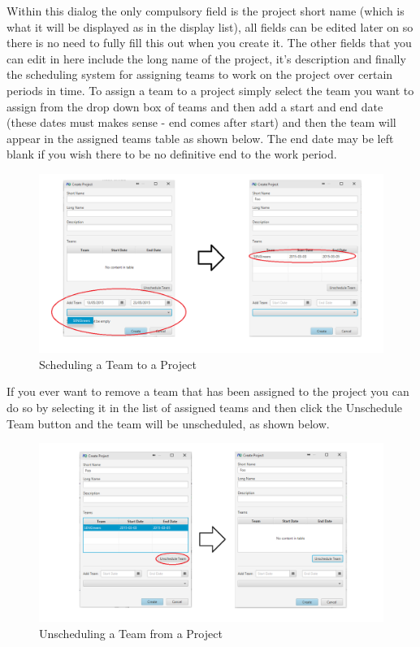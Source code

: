 Within this dialog the only compulsory field is the project short name (which is what it will be displayed as in the display list), all fields can be edited later on so there is no need to fully fill this out when you create it.
\newline
The other fields that you can edit in here include the long name of the project, it's description and finally the scheduling system for assigning teams to work on the project over certain periods in time. To assign a team to a project simply select the team you want to assign from the drop down box of teams and then add a start and end date (these dates must makes sense - end comes after start) and then the team will appear in the assigned teams table as shown below. The end date may be left blank if you wish there to be no definitive end to the work period.

\begin{figure}[H]
\centering
\includegraphics[width=\textwidth]{images/screenshots/projects2.PNG}
\caption{Scheduling a Team to a Project}
\label{fig:new_project}
\end{figure}

If you ever want to remove a team that has been assigned to the project you can do so by selecting it in the list of assigned teams and then click the Unschedule Team button and the team will be unscheduled, as shown below.

\begin{figure}[H]
\centering
\includegraphics[width=\textwidth]{images/screenshots/projects3.PNG}
\caption{Unscheduling a Team from a Project}
\label{fig:new_project}
\end{figure}

